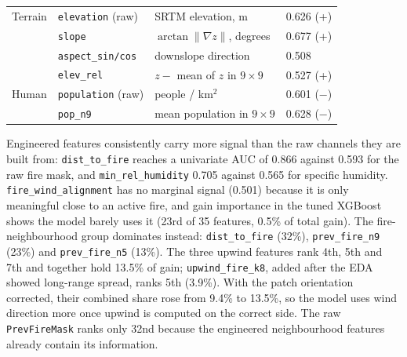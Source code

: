 \begin{table}[t]
\begin{tabular}{llll}
\hline
Terrain & \texttt{elevation} (raw) & SRTM elevation, m & 0.626 (+) \\
 & \texttt{slope} & $\arctan\lVert\nabla z\rVert$, degrees & 0.677 (+) \\
 & \texttt{aspect\_sin/cos} & downslope direction & 0.508 \\
 & \texttt{elev\_rel} & $z - $ mean of $z$ in $9\times9$ & 0.527 (+) \\
\hline
Human & \texttt{population} (raw) & people / km$^2$ & 0.601 ($-$) \\
 & \texttt{pop\_n9} & mean population in $9\times9$ & 0.628 ($-$) \\
\hline
\end{tabular}
\end{table}

Engineered features consistently carry more signal than the raw channels they are built from:
\texttt{dist\_to\_fire} reaches a univariate AUC of 0.866 against 0.593 for the raw fire mask,
and \texttt{min\_rel\_humidity} 0.705 against 0.565 for specific humidity.
\texttt{fire\_wind\_alignment} has no marginal signal (0.501) because it is only meaningful close
to an active fire, and gain importance in the tuned XGBoost shows the model barely uses it
(23rd of 35 features, 0.5\% of total gain). The fire-neighbourhood group dominates instead:
\texttt{dist\_to\_fire} (32\%), \texttt{prev\_fire\_n9} (23\%) and \texttt{prev\_fire\_n5} (13\%).
The three upwind features rank 4th, 5th and 7th and together hold 13.5\% of gain;
\texttt{upwind\_fire\_k8}, added after the EDA showed long-range spread, ranks 5th (3.9\%).
With the patch orientation corrected, their combined share rose from 9.4\% to 13.5\%,
so the model uses wind direction more once upwind is computed on the correct side.
The raw \texttt{PrevFireMask} ranks only 32nd because the engineered neighbourhood features already
contain its information.

